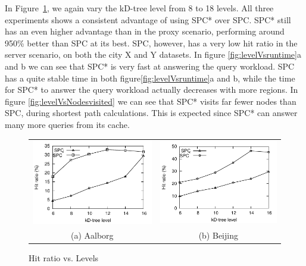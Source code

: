 %
%
In Figure~\ref{fig:levelVsHitRatio}, we again vary the kD-tree level from 8 to 18 levels. All three experiments shows a consistent advantage of using SPC* over SPC. SPC* still has an even higher advantage than in the proxy scenario, performing around 950\% better than SPC at its best. SPC, however, has a very low hit ratio in the server scenario, on both the city X and Y datasets. In figure \ref{fig:levelVsruntime}a and b we can see that SPC* is very fast at answering the query workload. SPC has a quite stable time in both figure\ref{fig:levelVsruntime}a and b, while the time for SPC* to answer the query workload actually decreases with more regions. In figure \ref{fig:levelVsNodesvisited} we can see that SPC* visits far fewer nodes than SPC, during shortest path calculations. This is expected since SPC* can answer many more queries from its cache.




\begin{figure}[htb]
\center
  \begin{tabular}{@{}c@{ }c@{}}
     \includegraphics[width=0.5\columnwidth]{figures/split_hitratio_aal_server.pdf}
     &
     \includegraphics[width=0.5\columnwidth]{figures/split_hitratio_bei_server.pdf}
      \\
     (a) Aalborg & (b)  Beijing
     \end{tabular}
\caption{Hit ratio vs. Levels}
\label{fig:levelVsHitRatio}
\end{figure}

